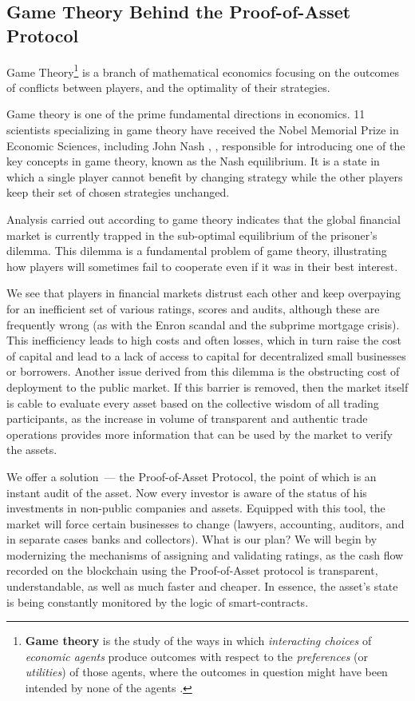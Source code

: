 \documentclass{article}
\begin{document}
\begin{multicols}{2}
\subsection{Game Theory Behind the Proof-of-Asset Protocol}

Game Theory\footnote{\textbf{Game theory} is the study of the ways in which \textit{interacting choices} of \textit{economic agents} produce outcomes with respect to the \textit{preferences} (or \textit{utilities}) of those agents, where the outcomes in question might have been intended by none of the agents \cite{stanfordGameTheory}.} is a branch of mathematical economics focusing on the outcomes of conflicts between players, and the optimality of their strategies.

Game theory is one of the prime fundamental directions in economics. 11 scientists specializing in game theory have received the Nobel Memorial Prize in Economic Sciences, including John Nash \cite{nash1950}, \cite{nash1951}, responsible for introducing one of the key concepts in game theory, known as the Nash equilibrium. It is a state in which a single player cannot benefit by changing strategy while the other players keep their set of chosen strategies unchanged. 

Analysis carried out according to game theory indicates that the global financial market is currently trapped in the sub-optimal equilibrium of the prisoner’s dilemma. This dilemma is a fundamental problem of game theory, illustrating how players will sometimes fail to cooperate even if it was in their best interest.

We see that players in financial markets distrust each other and keep overpaying for an inefficient set of various ratings, scores and audits, although these are frequently wrong (as with the Enron scandal and the subprime mortgage crisis). This inefficiency leads to high costs and often losses, which in turn raise the cost of capital and lead to a lack of access to capital for decentralized small businesses or borrowers. Another issue derived from this dilemma is the obstructing cost of deployment to the public market. If this barrier is removed, then the market itself is cable to evaluate every asset based on the collective wisdom of all trading participants, as the increase in volume of transparent and authentic trade operations provides more information that can be used by the market to verify the assets.

We offer a solution~--- the Proof-of-Asset Protocol, the point of which is an instant audit of the asset. Now every investor is aware of the status of his investments in non-public companies and assets. Equipped with this tool, the market will force certain businesses to change (lawyers, accounting, auditors, and in separate cases banks and collectors). What is our plan? We will begin by modernizing the mechanisms of assigning and validating ratings, as the cash flow recorded on the blockchain using the Proof-of-Asset protocol is transparent, understandable, as well as much faster and cheaper. In essence, the asset’s state is being constantly monitored by the logic of smart-contracts.


\end{multicols}
\end{document}
